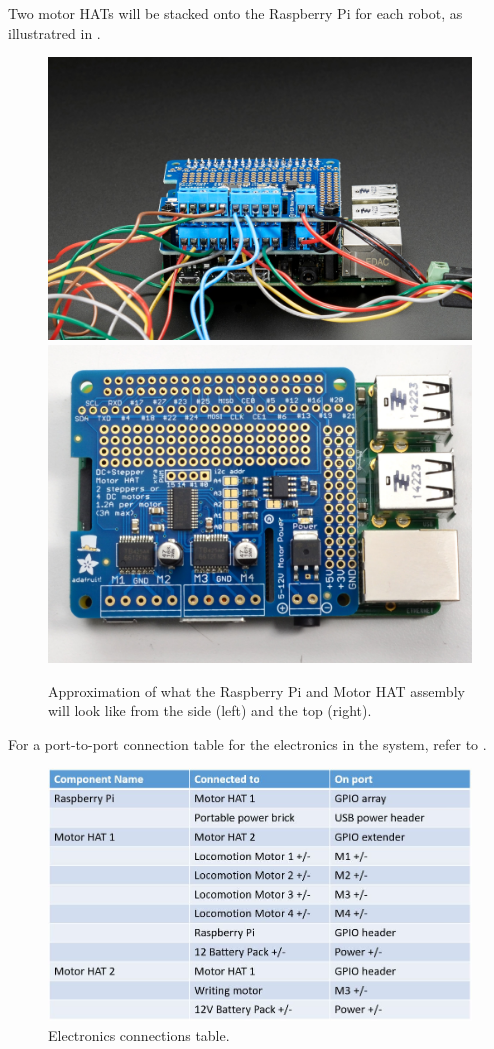 Two motor HATs will be stacked onto the Raspberry Pi for each robot, as illustratred in .

\begin{figure}
\centering
\includegraphics[width=0.45\columnwidth]{figs/HATs-on-pi.jpg}
\includegraphics[width=0.45\columnwidth]{figs/HAT-on-pi.jpg}
\caption{Approximation of what the Raspberry Pi and Motor HAT assembly will look like from the side (left) and the top (right).}
\label{fig:HATs}
\end{figure}

For a port-to-port connection table for the electronics in the system, refer to .

\begin{figure}
\centering
\includegraphics[width=0.9\columnwidth]{figs/electronics-table.JPG}
\caption{Electronics connections table.}
\label{fig:HATs}
\end{figure}
